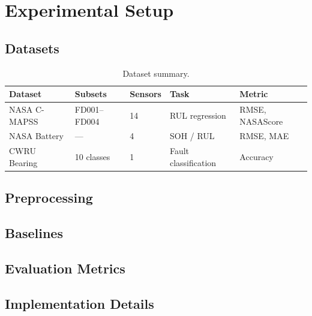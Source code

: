 \documentclass[AMA,Times1COL]{WileyNJDv5}
\begin{document}
\section{Experimental Setup}\label{sec:exp}

\subsection{Datasets}\label{sec:exp:data}

\begin{table}[!h]
\caption{Dataset summary.}\label{tab:datasets}
\begin{tabular}{lllll}
\toprule
Dataset & Subsets & Sensors & Task & Metric \\
\midrule
NASA C-MAPSS~\cite{Saxena2008} & FD001--FD004 & 14 & RUL regression & RMSE, NASAScore \\
NASA Battery & --- & 4 & SOH / RUL & RMSE, MAE \\
CWRU Bearing & 10 classes & 1 & Fault classification & Accuracy \\
\bottomrule
\end{tabular}
\end{table}

\subsection{Preprocessing}\label{sec:exp:preprocessing}

\subsection{Baselines}\label{sec:exp:baselines}

\subsection{Evaluation Metrics}\label{sec:exp:metrics}

\subsection{Implementation Details}\label{sec:exp:impl}
\end{document}
